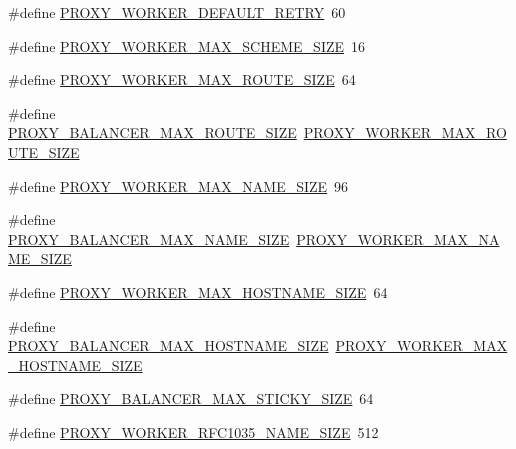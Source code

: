 \begin{DoxyCompactItemize}
\item 
\#define \hyperlink{group__MOD__PROXY_ga675bcbffe0aaaa2000bc848f352de381}{P\+R\+O\+X\+Y\+\_\+\+W\+O\+R\+K\+E\+R\+\_\+\+D\+E\+F\+A\+U\+L\+T\+\_\+\+R\+E\+T\+RY}~60
\item 
\#define \hyperlink{group__MOD__PROXY_ga79e4d8747fce219f39b35c301ca22b71}{P\+R\+O\+X\+Y\+\_\+\+W\+O\+R\+K\+E\+R\+\_\+\+M\+A\+X\+\_\+\+S\+C\+H\+E\+M\+E\+\_\+\+S\+I\+ZE}~16
\item 
\#define \hyperlink{group__MOD__PROXY_ga2728b95ba24f7a531b844a9a851a9392}{P\+R\+O\+X\+Y\+\_\+\+W\+O\+R\+K\+E\+R\+\_\+\+M\+A\+X\+\_\+\+R\+O\+U\+T\+E\+\_\+\+S\+I\+ZE}~64
\item 
\#define \hyperlink{group__MOD__PROXY_ga2bd0099774c756d192e76a950ad910ae}{P\+R\+O\+X\+Y\+\_\+\+B\+A\+L\+A\+N\+C\+E\+R\+\_\+\+M\+A\+X\+\_\+\+R\+O\+U\+T\+E\+\_\+\+S\+I\+ZE}~\hyperlink{group__MOD__PROXY_ga2728b95ba24f7a531b844a9a851a9392}{P\+R\+O\+X\+Y\+\_\+\+W\+O\+R\+K\+E\+R\+\_\+\+M\+A\+X\+\_\+\+R\+O\+U\+T\+E\+\_\+\+S\+I\+ZE}
\item 
\#define \hyperlink{group__MOD__PROXY_ga751f27e58f7f2c2ac2921fcbb9f28624}{P\+R\+O\+X\+Y\+\_\+\+W\+O\+R\+K\+E\+R\+\_\+\+M\+A\+X\+\_\+\+N\+A\+M\+E\+\_\+\+S\+I\+ZE}~96
\item 
\#define \hyperlink{group__MOD__PROXY_ga157b5bc40c7ae69c5f7e8df2d813eb71}{P\+R\+O\+X\+Y\+\_\+\+B\+A\+L\+A\+N\+C\+E\+R\+\_\+\+M\+A\+X\+\_\+\+N\+A\+M\+E\+\_\+\+S\+I\+ZE}~\hyperlink{group__MOD__PROXY_ga751f27e58f7f2c2ac2921fcbb9f28624}{P\+R\+O\+X\+Y\+\_\+\+W\+O\+R\+K\+E\+R\+\_\+\+M\+A\+X\+\_\+\+N\+A\+M\+E\+\_\+\+S\+I\+ZE}
\item 
\#define \hyperlink{group__MOD__PROXY_ga138c44ad87fee2de3c6bde581b18d140}{P\+R\+O\+X\+Y\+\_\+\+W\+O\+R\+K\+E\+R\+\_\+\+M\+A\+X\+\_\+\+H\+O\+S\+T\+N\+A\+M\+E\+\_\+\+S\+I\+ZE}~64
\item 
\#define \hyperlink{group__MOD__PROXY_ga825d28b2cebd3cf8cfc77494cfcf3a43}{P\+R\+O\+X\+Y\+\_\+\+B\+A\+L\+A\+N\+C\+E\+R\+\_\+\+M\+A\+X\+\_\+\+H\+O\+S\+T\+N\+A\+M\+E\+\_\+\+S\+I\+ZE}~\hyperlink{group__MOD__PROXY_ga138c44ad87fee2de3c6bde581b18d140}{P\+R\+O\+X\+Y\+\_\+\+W\+O\+R\+K\+E\+R\+\_\+\+M\+A\+X\+\_\+\+H\+O\+S\+T\+N\+A\+M\+E\+\_\+\+S\+I\+ZE}
\item 
\#define \hyperlink{group__MOD__PROXY_gaa1431c0055d737cebc5048edfe1e8889}{P\+R\+O\+X\+Y\+\_\+\+B\+A\+L\+A\+N\+C\+E\+R\+\_\+\+M\+A\+X\+\_\+\+S\+T\+I\+C\+K\+Y\+\_\+\+S\+I\+ZE}~64
\item 
\#define \hyperlink{group__MOD__PROXY_gab602175a989fac6b0ba891add75544ee}{P\+R\+O\+X\+Y\+\_\+\+W\+O\+R\+K\+E\+R\+\_\+\+R\+F\+C1035\+\_\+\+N\+A\+M\+E\+\_\+\+S\+I\+ZE}~512

\end{DoxyCompactItemize}
